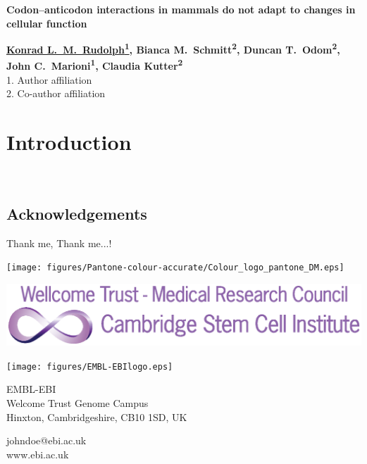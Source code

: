 \documentclass[a0,portrait]{a0poster}
\newcommand\ptitle[2]{\linespread{#1}\selectfont\veryHuge\color{EMBLBlue}\textbf{#2}\par\bigskip}
\begin{document}
\begin{minipage}[b]{1.0\linewidth}
    \sffamily
    \ptitle{1}{Codon–anticodon interactions in mammals do not adapt to changes
    in cellular function}
    \Large\color{Black}%
    \textbf{%
        \underline{Konrad L.\ M.\ Rudolph\textsuperscript{1}},
        Bianca M.\ Schmitt\textsuperscript{2},
        Duncan T.\ Odom\textsuperscript{2},
        John C.\ Marioni\textsuperscript{1},
        Claudia Kutter\textsuperscript{2}
    }
    \\[0.5cm]
    \normalsize 1. Author affiliation
    \\2. Co-author affiliation
\end{minipage}

\vspace{1cm}
\renewcommand\baselinestretch{1}

\begin{multicols}{2}
\large

\section*{Introduction}
\blindtext ~\citep{Reynolds2012a}

\small
\begin{multicols}{2}
    

    \section*{Acknowledgements}

    Thank me, Thank me...!
\end{multicols}
\end{multicols}

\vfill

\begin{minipage}[][][b]{0.20\linewidth}
    \texttt{[image: figures/Pantone-colour-accurate/Colour\_logo\_pantone\_DM.eps]}
\end{minipage}%
\qquad%
\begin{minipage}[][][b]{0.20\linewidth}
    \includegraphics[width=15cm]{figures/SCI_logo.eps}
\end{minipage}%
\qquad%
\begin{minipage}[][][b]{0.20\linewidth}
    \texttt{[image: figures/EMBL-EBIlogo.eps]}
\end{minipage}%
\qquad%
\begin{minipage}[][][b]{0.20\linewidth}
    \color{EMBLBlue}
    EMBL-EBI \\
    Welcome Trust Genome Campus \\
    Hinxton, Cambridgeshire, CB10 1SD, UK
    \end{minipage}
    \qquad
    \begin{minipage}[][][b]{0.20\linewidth}
    \color{EMBLBlue}

    johndoe@ebi.ac.uk \\
    www.ebi.ac.uk
\end{minipage}
\end{document}
